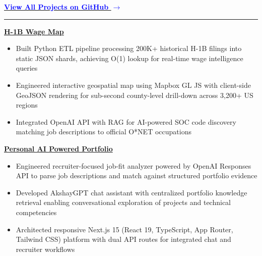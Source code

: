 \documentclass[10pt]{article}
\begin{document}
\vspace{-0.5cm}


 \hfill \href{https://github.com/idealidler?tab=repositories}{\textcolor{blue}{\textbf{View All Projects on GitHub $\rightarrow$}}}\par
\vspace{-0.25cm}
\hrule
\vspace{0.3cm}

\noindent\href{https://www.wagelevelh1b.com}{\textbf{H-1B Wage Map}}
\vspace{0.1cm}


\begin{itemize}[leftmargin=*, label={•}]


\item Built Python ETL pipeline processing 200K+ historical H-1B filings into static JSON shards, achieving O(1) lookup for real-time wage intelligence queries

\vspace{0.1cm}

\item Engineered interactive geospatial map using Mapbox GL JS with client-side GeoJSON rendering for sub-second county-level drill-down across 3,200+ US regions

\vspace{0.1cm}

\item Integrated OpenAI API with RAG for AI-powered SOC code discovery matching job descriptions to official O*NET occupations

\end{itemize}

\vspace{0.3cm}
\noindent\href{https://www.akshayjain.vip}{\textbf{Personal AI Powered Portfolio}}
\vspace{0.1cm}

\begin{itemize}[leftmargin=*, label={•}]

\item Engineered recruiter-focused job-fit analyzer powered by OpenAI Responses API to parse job descriptions and match against structured portfolio evidence

\vspace{0.1cm}

\item Developed AkshayGPT chat assistant with centralized portfolio knowledge retrieval enabling conversational exploration of projects and technical competencies

\vspace{0.1cm}

\item Architected responsive Next.js 15 (React 19, TypeScript, App Router, Tailwind CSS) platform with dual API routes for integrated chat and recruiter workflows




\end{itemize}
\end{document}
